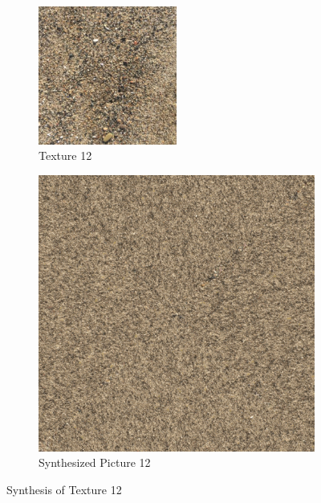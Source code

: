 \documentclass{article}
\begin{document}
\begin{figure}[htbp!]
    \centering
    \begin{subfigure}[b]{0.49\textwidth}
        \centering
        \includegraphics[width=0.5\textwidth]{../Code/Textures/12.png}
        \caption{Texture 12}
        \label{fig:original-12}
    \end{subfigure}
    \hfill %
    \begin{subfigure}[b]{0.49\textwidth}
        \centering
        \includegraphics[width=\textwidth]{../Result/12.png}
        \caption{Synthesized Picture 12}
        \label{fig:synthesized-12}
    \end{subfigure}
    \caption{Synthesis of Texture 12}
    \label{fig:synthesis-12}
\end{figure}
\end{document}
